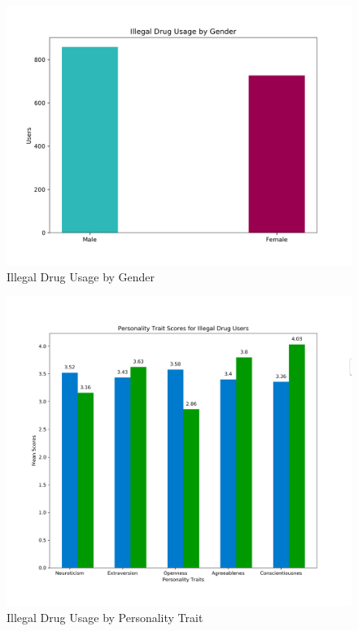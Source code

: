 \documentclass[10pt]{article}
\begin{document}
\begin{figure}[H]
\caption{Illegal Drug Usage by  Gender}
\centering
\includegraphics[scale=0.25]{genders.png}
\end{figure}

\begin{figure}[H]
\caption{Illegal Drug Usage by Personality Trait}
\centering
\includegraphics[scale=0.25]{traits.png}
\end{figure}
\end{document}
